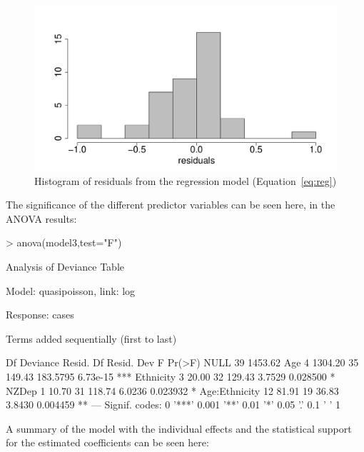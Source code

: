 \documentclass{article}
\begin{document}
\begin{figure}[h!]
\begin{center}
\includegraphics{interimreport2-017}
\end{center}
\caption{Histogram of residuals from the regression model (Equation~\ref{eq:reg})}
\label{fig:resid}
\end{figure}
The significance of the different predictor variables can be seen here, in the ANOVA results:

\begin{Schunk}
\begin{Sinput}
> anova(model3,test="F")
\end{Sinput}
\begin{Soutput}
Analysis of Deviance Table

Model: quasipoisson, link: log

Response: cases

Terms added sequentially (first to last)


              Df Deviance Resid. Df Resid. Dev        F   Pr(>F)    
NULL                             39    1453.62                      
Age            4  1304.20        35     149.43 183.5795 6.73e-15 ***
Ethnicity      3    20.00        32     129.43   3.7529 0.028500 *  
NZDep          1    10.70        31     118.74   6.0236 0.023932 *  
Age:Ethnicity 12    81.91        19      36.83   3.8430 0.004459 ** 
---
Signif. codes:  0 '***' 0.001 '**' 0.01 '*' 0.05 '.' 0.1 ' ' 1
\end{Soutput}
\end{Schunk}

A summary of the model with the individual effects and the statistical support for the estimated coefficients can be seen here:
\end{document}
